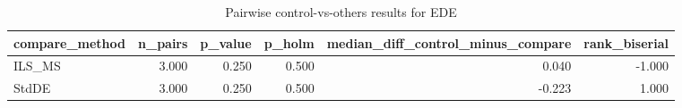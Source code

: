 \begin{table}[!t]
\centering
\caption{Pairwise control-vs-others results for EDE}
\label{tab:posthoc_holm_generated}
\begin{tabular}{lrrrrr}
\toprule
compare_method & n_pairs & p_value & p_holm & median_diff_control_minus_compare & rank_biserial \\
\midrule
ILS_MS & 3.000 & 0.250 & 0.500 & 0.040 & -1.000 \\
StdDE & 3.000 & 0.250 & 0.500 & -0.223 & 1.000 \\
\bottomrule
\end{tabular}

\end{table}